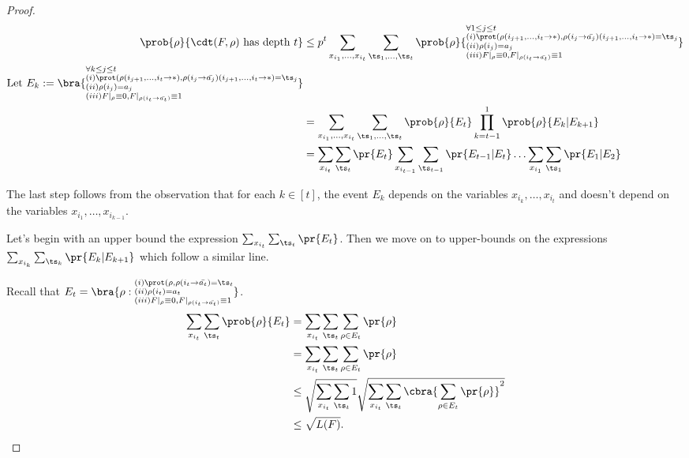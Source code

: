 \begin{proof}    
    \begin{align*}
        \prob{\rho}{\cdt(F,\rho) \mathrm{\ has\ depth\ } t}   
        &\leq p^t\sum_{x_{i_1}, \dots , x_{i_t}}
                \sum_{\ts_1, \dots ,\ts_t}
                    \prob{\rho}{\Eone} \\
    \text{Let\ } E_k := \bra{\Ek}\\
        &=\sum_{x_{i_1}, \dots , x_{i_t}} 
            \sum_{\ts_1, \dots ,\ts_t}
                \prob{\rho}{E_t}\prod_{k=t-1}^1 \prob{\rho}{E_k|E_{k+1}}\\
        &= \sum_{x_{i_t}} \sum_{\ts_t} \pr{E_t} \sum_{x_{i_{t-1}}} \sum_{\ts_{t-1}}\pr{E_{t-1}|E_t}\ldots  \sum_{x_{i_1}} \sum_{\ts_1} \pr{E_1|E_2}
    \end{align*}
    
    The last step follows from the observation that for each $k \in [t]$, the event $E_k$ depends on the variables $x_{i_k}, \ldots, x_{i_t}$ and doesn't depend on the variables $x_{i_1}, \ldots , x_{i_{k-1}}$.
    
    Let's begin with an upper bound the expression $\sum_{x_{i_t}}\sum_{\ts_t} \pr{E_t}$. Then we move on to upper-bounds on the expressions $\sum_{x_{i_k}} \sum_{\ts_k} \pr{E_k|E_{k+1}}$ which follow a similar line.
    
    Recall that $E_t = \bra{\rho: \Et}$.
        \begin{align*}
            \sum_{x_{i_t}} \sum_{\ts_t} \prob{\rho}{E_t}
        &= \sum_{x_{i_t}} 
            \sum_{\ts_t} 
                \sum_{\rho \in E_t} 
                        \pr{\rho}\\                          
        &= \sum_{x_{i_t}} 
            \sum_{\ts_t} 
                    \sum_{
                        \rho \in E_t    
                    } 
                        \pr{\rho}\\ 
        &\leq \sqrt{
                \sum_{x_{i_t}} 
                    \sum_{\ts_t} 
                        1
                } 
        \sqrt{
            \sum_{x_{i_t}} 
                \sum_{\ts_t}
                    \cbra{
                            \sum_{\rho \in E_{t}} \pr{\rho}
                    }^2
        } \\
        &\leq \sqrt{L(F)}.
    \end{align*}


\end{proof}
